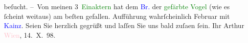                     beſucht.\pend
           \pstart
           – Von meinen 3 \textcolor{green}{Einaktern}
                    hat dem \textcolor{blue}{Br.} der \textcolor{green}{gefärbte Vogel} (wie es ſcheint
                    weitaus) am beſten gefallen. \introOben{}Aufführung wahrſcheinlich
                            Februar mit \textcolor{blue}{Kainz}.\introOben{}\pend
           \pstart
           Seien Sie herzlich gegrüßt und laſſen Sie uns bald zuſa{\geminationm}en ſein.\pend
           \pstart Ihr \spacefill\mbox{Arthur}\pend{}\pstart
           \textcolor{pink}{Wien},
                        14. X. 98.\pend
           \endnumbering{}  
